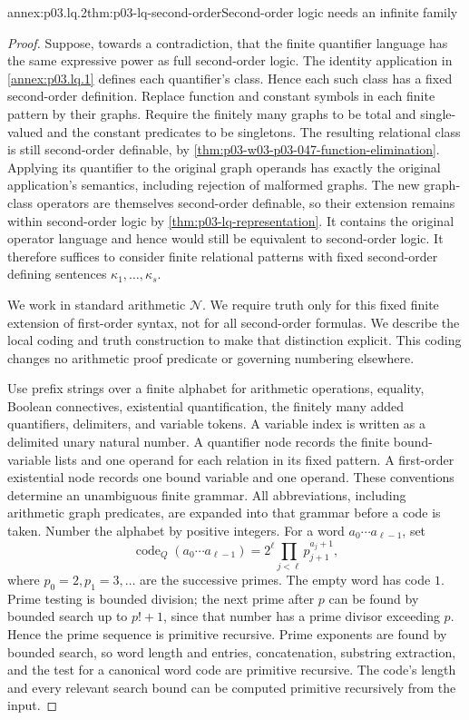 \begin{annexitem}{annex:p03.lq.2}{thm:p03-lq-second-order}{Second-order logic needs an infinite family}
\begin{proof}
Suppose, towards a contradiction, that the finite quantifier language
has the same expressive power as full second-order logic. The
identity application in \cref{annex:p03.lq.1} defines
each quantifier's class. Hence each such class has a fixed
second-order definition. Replace function and constant symbols in
each finite pattern by their graphs. Require the finitely many
graphs to be total and single-valued and the constant predicates
to be singletons. The resulting relational class is still
second-order definable, by
\cref{thm:p03-w03-p03-047-function-elimination}. Applying its
quantifier to the original graph operands has exactly the original
application's semantics, including rejection of malformed graphs.
The new graph-class operators are themselves second-order definable,
so their extension remains within second-order logic by
\cref{thm:p03-lq-representation}. It contains the original operator
language and hence would still be equivalent to second-order logic.
It therefore suffices to consider finite relational patterns with
fixed second-order defining sentences \(\kappa_1,\ldots,\kappa_s\).

We work in standard arithmetic \(\mathcal N\). We require truth
only for this fixed finite extension of first-order syntax, not for
all second-order formulas. We describe the local coding and truth
construction to make that distinction explicit. This coding changes
no arithmetic proof predicate or governing numbering elsewhere.

Use prefix strings over a finite alphabet for arithmetic operations,
equality, Boolean connectives, existential quantification, the
finitely many added quantifiers, delimiters, and variable tokens.
A variable index is written as a delimited unary natural number.
A quantifier node records the finite bound-variable lists and one
operand for each relation in its fixed pattern. A first-order
existential node records one bound variable and one operand.
These conventions determine an unambiguous finite grammar.
All abbreviations, including arithmetic graph predicates, are expanded
into that grammar before a code is taken.
Number the alphabet by positive integers. For a word
\(a_0\cdots a_{\ell-1}\), set
\[
 \operatorname{code}_Q(a_0\cdots a_{\ell-1})
   =2^\ell\prod_{j<\ell}p_{j+1}^{a_j+1},
\]
where \(p_0=2,p_1=3,\ldots\) are the successive primes.
The empty word has code \(1\).
Prime testing is bounded division; the next prime after \(p\)
can be found by bounded search up to \(p!+1\), since that number
has a prime divisor exceeding \(p\). Hence the prime sequence is
primitive recursive. Prime exponents are found by bounded search,
so word length and entries, concatenation, substring extraction,
and the test for a canonical word code are primitive recursive.
The code's length and every relevant search bound can be computed
primitive recursively from the input.


\end{proof}
\end{annexitem}
